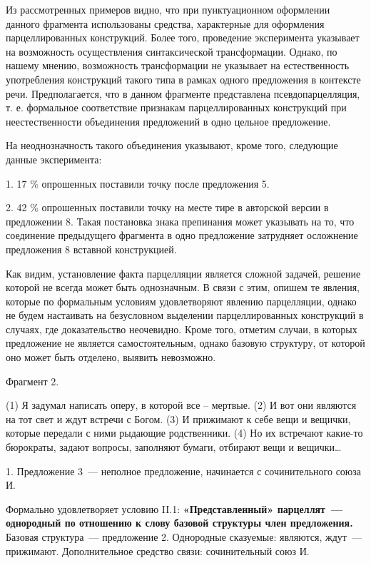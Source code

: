 \documentclass{kursa4}
\begin{document}
{      {}{Из
      рассмотренных примеров видно, что при пунктуационном оформлении данного
      фрагмента использованы средства, характерные для оформления
      парцеллированных конструкций. Более того, проведение эксперимента
      указывает на возможность осуществления синтаксической трансформации.
      Однако, по нашему мнению, возможность трансформации не указывает на
      естественность употребления конструкций такого типа в рамках одного
      предложения в контексте речи.
      }{Предполагается, что в данном фрагменте
      представлена псевдопарцелляция, т. е. формальное соответствие признакам
      парцеллированных конструкций при неестественности объединения
      предложений в одно цельное предложение. }

      {}{На
      неоднозначность такого объединения указывают, кроме того, следующие
      данные эксперимента:}

      {1. 17 \% опрошенных поставили точку
      после предложения 5.}

      {2. }{42 \%
      опрошенных поставили точку на месте тире в авторской версии в
      предложении 8. Такая постановка знака препинания может указывать на то,
      что соединение предыдущего фрагмента в одно предложение затрудняет
      осложнение предложения 8 вставной конструкцией. }

      {Как видим, установление факта
      парцелляции является сложной задачей, решение которой не всегда может
      быть однозначным. В связи с этим, опишем те явления, которые по
      формальным условиям удовлетворяют явлению парцелляции, однако не будем
      настаивать на безусловном выделении парцеллированных конструкций в
      случаях, где доказательство неочевидно. Кроме того, отметим случаи, в
      которых предложение не
      }{является}{
      самостоятельным, однако базовую структуру, от которой оно может быть
      отделено, выявить невозможно. }

      {Фрагмент 2. }

      {(1) Я задумал написать оперу, в которой
      все – мертвые. (2) И вот они являются на тот свет и ждут встречи с
      Богом. (3) И прижимают к себе вещи и вещички, которые передали с ними
      рыдающие родственники. (4) Но их встречают какие-то бюрократы, задают
      вопросы, заполняют бумаги, отбирают вещи и вещички…}

      {1. Предложение 3~--- неполное
      предложение, начинается с сочинительного союза И.}

      {Формально удовлетворяет условию II.1:
      }\textbf{{«Представленный» парцеллят~---
      однородный по отношению к слову базовой структуры член предложения.
      }}{Базовая структура~--- предложение 2.
      Однородные сказуемые: являются, ждут~--- прижимают. Дополнительное
      средство связи: сочинительный союз И.}

}
\end{document}
